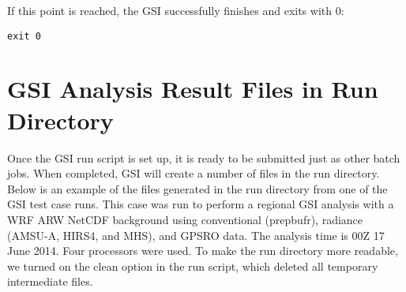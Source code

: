 If this point is reached, the GSI successfully finishes and exits with 0:

\begin{small}
\begin{verbatim}
exit 0
\end{verbatim}
\end{small}

\section{GSI Analysis Result Files in Run Directory}\label{sec3.3}

Once the GSI run script is set up, it is ready to be submitted just as other batch jobs. When completed, GSI will create a number of files in the run directory. Below is an example of the files generated in the run directory from one of the GSI test case runs. This case was run to perform a regional GSI analysis with a WRF ARW NetCDF background using conventional (prepbufr), radiance (AMSU-A, HIRS4, and MHS), and GPSRO data. The analysis time is 00Z 17 June 2014. Four processors were used. To make the run directory more readable, we turned on the clean option in the run script, which deleted all temporary intermediate files. 

